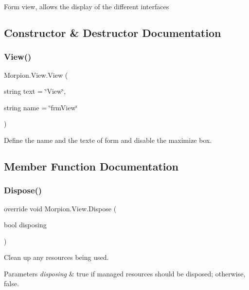 Form view, allows the display of the different interfaces 

\subsection{Constructor \& Destructor Documentation}
\mbox{\label{class_morpion_1_1_view_ab8a0a6c6141f31f7e175ba5ad49140c3}} 
\subsubsection{\texorpdfstring{View()}{View()}}
{\footnotesize\ttfamily Morpion.\+View.\+View (\begin{DoxyParamCaption}\item[{string}]{text = {\ttfamily \char`\"{}View\char`\"{}},  }\item[{string}]{name = {\ttfamily \char`\"{}frmView\char`\"{}} }\end{DoxyParamCaption})}



Define the name and the texte of form and disable the maximize box. 



\subsection{Member Function Documentation}
\mbox{\label{class_morpion_1_1_view_a3c537c54a79236b4cfd9e78415dd48f5}} 
\subsubsection{\texorpdfstring{Dispose()}{Dispose()}}
{\footnotesize\ttfamily override void Morpion.\+View.\+Dispose (\begin{DoxyParamCaption}\item[{bool}]{disposing }\end{DoxyParamCaption})\hspace{0.3cm}{\ttfamily [protected]}}



Clean up any resources being used. 


\begin{DoxyParams}{Parameters}
{\em disposing} & true if managed resources should be disposed; otherwise, false.\\
\hline
\end{DoxyParams}


